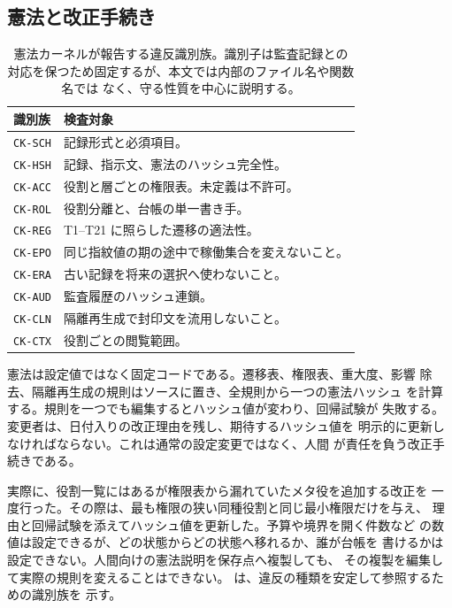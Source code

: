 \subsection{憲法と改正手続き}\label{sec:rqgm:constitution}

\begin{table}[t]
  \centering
  \small
  \begin{tabularx}{\columnwidth}{@{}lX@{}}
    \toprule
    \textbf{識別族} & \textbf{検査対象} \\
    \midrule
    \texttt{CK-SCH} & 記録形式と必須項目。 \\
    \texttt{CK-HSH} & 記録、指示文、憲法のハッシュ完全性。 \\
    \texttt{CK-ACC} & 役割と層ごとの権限表。未定義は不許可。 \\
    \texttt{CK-ROL} & 役割分離と、台帳の単一書き手。 \\
    \texttt{CK-REG} & T1--T21 に照らした遷移の適法性。 \\
    \texttt{CK-EPO} & 同じ指紋値の期の途中で稼働集合を変えないこと。 \\
    \texttt{CK-ERA} & 古い記録を将来の選択へ使わないこと。 \\
    \texttt{CK-AUD} & 監査履歴のハッシュ連鎖。 \\
    \texttt{CK-CLN} & 隔離再生成で封印文を流用しないこと。 \\
    \texttt{CK-CTX} & 役割ごとの閲覧範囲。 \\
    \bottomrule
  \end{tabularx}
  \caption{憲法カーネルが報告する違反識別族。識別子は監査記録との
    対応を保つため固定するが、本文では内部のファイル名や関数名では
    なく、守る性質を中心に説明する。}
  \label{tab:ck-codes}
\end{table}

憲法は設定値ではなく固定コードである。遷移表、権限表、重大度、影響
除去、隔離再生成の規則はソースに置き、全規則から一つの憲法ハッシュ
を計算する。規則を一つでも編集するとハッシュ値が変わり、回帰試験が
失敗する。変更者は、日付入りの改正理由を残し、期待するハッシュ値を
明示的に更新しなければならない。これは通常の設定変更ではなく、人間
が責任を負う改正手続きである。

実際に、役割一覧にはあるが権限表から漏れていたメタ役を追加する改正を
一度行った。その際は、最も権限の狭い同種役割と同じ最小権限だけを与え、
理由と回帰試験を添えてハッシュ値を更新した。予算や境界を開く件数など
の数値は設定できるが、どの状態からどの状態へ移れるか、誰が台帳を
書けるかは設定できない。人間向けの憲法説明を保存点へ複製しても、
その複製を編集して実際の規則を変えることはできない。
 は、違反の種類を安定して参照するための識別族を
示す。

